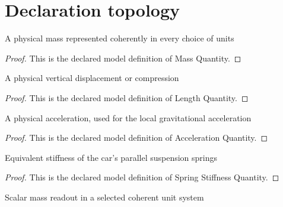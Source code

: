 \section{Declaration topology}
\begin{definition}
  \label{def:physics:phyx-mini-0199:phyxminiproblems-problemphyxmini0199-massquantity}
  A physical mass represented coherently in every choice of units
\end{definition}
\begin{proof}
  This is the declared model definition of Mass Quantity.
\end{proof}
\begin{definition}
  \label{def:physics:phyx-mini-0199:phyxminiproblems-problemphyxmini0199-lengthquantity}
  A physical vertical displacement or compression
\end{definition}
\begin{proof}
  This is the declared model definition of Length Quantity.
\end{proof}
\begin{definition}
  \label{def:physics:phyx-mini-0199:phyxminiproblems-problemphyxmini0199-accelerationquantity}
  A physical acceleration, used for the local gravitational acceleration
\end{definition}
\begin{proof}
  This is the declared model definition of Acceleration Quantity.
\end{proof}
\begin{definition}
  \label{def:physics:phyx-mini-0199:phyxminiproblems-problemphyxmini0199-springstiffnessquantity}
  Equivalent stiffness of the car's parallel suspension springs
\end{definition}
\begin{proof}
  This is the declared model definition of Spring Stiffness Quantity.
\end{proof}
\begin{definition}
  \label{def:physics:phyx-mini-0199:phyxminiproblems-problemphyxmini0199-massreadout}
  Scalar mass readout in a selected coherent unit system
\end{definition}
